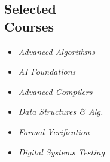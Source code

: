 \documentclass[margin,line,letter]{resume}
\begin{document}
\begin{resume}
\section{\mysidestyle Selected\\Courses}
    \vspace{-0.02cm}
        \begin{multicols}{3}
        \begin{itemize}
        \item[] \emph{Advanced Algorithms}
        \item[] \emph{AI Foundations}
        \item[] \emph{Advanced Compilers}
        \item[] \emph{Data Structures \& Alg.}
        \item[] \emph{Formal Verification}
        \item[] \emph{Digital Systems Testing}
        \end{itemize}
        \end{multicols}
    
        

\end{resume}
\end{document}
